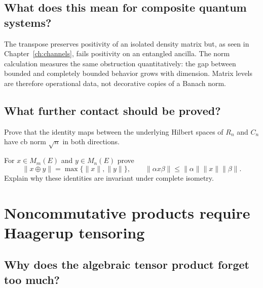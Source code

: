 \section{What does this mean for composite quantum systems?}

The transpose preserves positivity of an isolated density matrix but, as
seen in Chapter~\ref{ch:channels}, fails positivity on an entangled ancilla.
The norm calculation measures the same obstruction quantitatively: the gap
between bounded and completely bounded behavior grows with dimension.  Matrix
levels are therefore operational data, not decorative copies of a Banach
norm.

\section{What further contact should be proved?}

\begin{exercise}
Prove that the identity maps between the underlying Hilbert spaces of $R_n$
and $C_n$ have cb norm $\sqrt n$ in both directions.
\end{exercise}

\begin{exercise}
For $x\in M_m(E)$ and $y\in M_n(E)$ prove
\[
\|x\oplus y\|=\max\{\|x\|,\|y\|\},\qquad
\|\alpha x\beta\|\leq\|\alpha\|\|x\|\|\beta\|.
\]
Explain why these identities are invariant under complete isometry.
\end{exercise}


\chapter{Noncommutative products require Haagerup tensoring}
\label{ch:haagerup}



\section{Why does the algebraic tensor product forget too much?}

